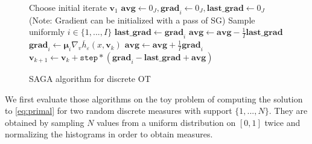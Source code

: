 \begin{figure}[h]
    \centering
    \begin{minipage}{.8\linewidth}
    \begin{algorithm}[H]
        \caption{SAGA algorithm for discrete OT}\label{alg:saga_discrete}
        \begin{algorithmic}[1]
            \State Choose initial iterate $\bm{v}_1$
            \State $\mathbf{avg} \gets 0_J, \mathbf{grad}_i \gets 0_J, \mathbf{last\_grad} \gets 0_J$
            \State (Note: Gradient can be initialized with a pass of SG)
                \State Sample uniformly $i \in \{1, ..., I\}$
                \State $\mathbf{last\_grad} \gets \mathbf{grad}_i$
                \State $\mathbf{avg} \gets \mathbf{avg} - \frac{1}{I}\mathbf{last\_grad}$
                \State $\mathbf{grad}_i \gets \bm{\mu}_i \nabla_v \overline{h}_\varepsilon(x, \bm{v}_k)$
                \State $\mathbf{avg} \gets \mathbf{avg} + \frac{1}{I}\mathbf{grad}_i$
                \State $\bm{v}_{k+1} \gets \bm{v}_k + \texttt{step} * (\mathbf{grad}_i - \mathbf{last\_grad} + \mathbf{avg})$
            \EndFor
        \end{algorithmic}
    \end{algorithm}
\end{minipage}
\end{figure}

We first evaluate those algorithms on the toy problem of computing the solution to \eqref{eq:primal} for two random discrete measures with support $\{1,..., N\}$. They are obtained by sampling $N$ values from a uniform distribution on $[0, 1]$ twice and normalizing the histograms in order to obtain measures.

